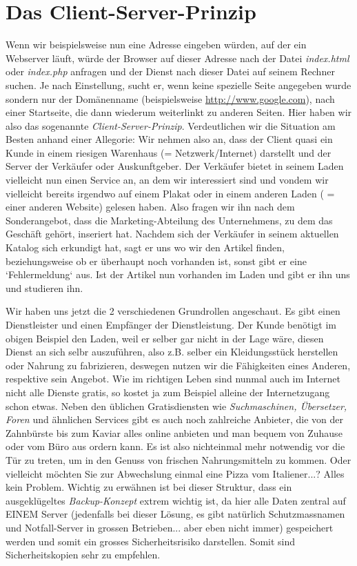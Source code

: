\documentclass[b5paper,10pt,dvips,fleqn,titlepage,twoside]{book}
\begin{document}
\section{Das Client-Server-Prinzip}
Wenn wir beispielsweise nun eine Adresse eingeben würden, auf der ein Webserver läuft, würde der Browser auf dieser Adresse nach der Datei \emph{index.html} oder \emph{index.php} anfragen und der Dienst nach dieser Datei auf seinem Rechner suchen. Je nach Einstellung, sucht er, wenn keine spezielle Seite angegeben wurde sondern nur der Domänenname (beispielsweise \url{http://www.google.com}), nach einer Startseite, die dann wiederum weiterlinkt zu anderen Seiten.
Hier haben wir also das sogenannte \emph{Client-Server-Prinzip}. Verdeutlichen wir die Situation am Besten anhand einer Allegorie: Wir nehmen also an, dass der Client quasi ein Kunde in einem riesigen Warenhaus (= Netzwerk/Internet) darstellt und der Server der Verkäufer oder Auskunftgeber. Der Verkäufer bietet in seinem Laden vielleicht nun einen Service an, an dem wir interessiert sind und vondem wir  vielleicht bereits irgendwo auf einem Plakat oder in einem anderen Laden ( = einer anderen Website) gelesen haben. Also fragen wir ihn nach dem Sonderangebot, dass die Marketing-Abteilung des Unternehmens, zu dem das Geschäft gehört, inseriert hat. Nachdem sich der Verkäufer in seinem aktuellen Katalog sich erkundigt hat, sagt er uns wo wir den Artikel finden, beziehungsweise ob er überhaupt noch vorhanden ist, sonst gibt er eine `Fehlermeldung` aus. Ist der Artikel nun vorhanden im Laden und gibt er ihn uns und studieren ihn.\newline

Wir haben uns jetzt die 2 verschiedenen Grundrollen angeschaut. Es gibt einen Dienstleister und einen Empfänger der Dienstleistung. Der Kunde benötigt im obigen Beispiel den Laden, weil er selber gar nicht in der Lage wäre, diesen Dienst an sich selbr auszuführen, also z.B. selber ein Kleidungsstück herstellen oder Nahrung zu fabrizieren, deswegen nutzen wir die Fähigkeiten eines Anderen, respektive sein Angebot. Wie im richtigen Leben sind nunmal auch im Internet nicht alle Dienste gratis, so kostet ja zum Beispiel alleine der Internetzugang schon etwas. Neben den üblichen Gratisdiensten wie \emph{Suchmaschinen, Übersetzer, Foren} und ähnlichen Services gibt es auch noch zahlreiche Anbieter, die von der Zahnbürste bis zum Kaviar alles online anbieten und man bequem von Zuhause oder vom Büro aus ordern kann. Es ist also nichteinmal mehr notwendig vor die Tür zu treten, um in den Genuss von frischen Nahrungsmitteln zu kommen. Oder vielleicht möchten Sie zur Abwechslung einmal eine Pizza vom Italiener...? Alles kein Problem.\newline
Wichtig zu erwähnen ist bei dieser Struktur, dass ein ausgeklügeltes \emph{Backup-Konzept} extrem wichtig ist, da hier alle Daten zentral auf EINEM Server (jedenfalls bei dieser Lösung, es gibt natürlich Schutzmassnamen und Notfall-Server in grossen Betrieben... aber eben nicht immer) gespeichert werden und somit ein grosses Sicherheitsrisiko darstellen. Somit sind Sicherheitskopien sehr zu empfehlen.\newline
\end{document}
